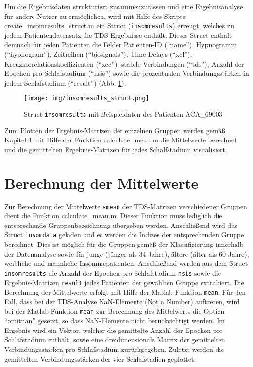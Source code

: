 Um die Ergebnisdaten strukturiert zusammenzufassen und eine Ergebnisanalyse für andere Nutzer zu ermöglichen, wird mit Hilfe des Skripts create\_insomresults\_struct.m ein Struct (\texttt{insomresults}) erzeugt, welches zu jedem Patientendatensatz die \acs{TDS}-Ergebnisse enthält. Dieses Struct enthält demnach für jeden Patienten die Felder Patienten-ID ("`name"'), Hypnogramm ("`hypnogram"'), Zeitreihen ("`biosignals"'), Time Delays ("`xcl"'), Kreuzkorrelationskoeffizienten ("`xcc"'), stabile Verbindungen ("`tds"'), Anzahl der Epochen pro Schlafstadium ("`nsis"') sowie die prozentualen Verbindungsstärken in jedem Schlafstadium ("`result"') (Abb. \ref{fig:resultstruct}).

\begin{figure}[H]
	\centering
	\texttt{[image: img/insomresults\_struct.png]}
	\caption[Struct \texttt{insomresults} mit Beispieldaten]{Struct \texttt{insomresults} mit Beispieldaten des Patienten ACA\_69003}
	\label{fig:resultstruct}
\end{figure}

Zum Plotten der Ergebnis-Matrizen der einzelnen Gruppen werden gemäß Kapitel \ref{mean} mit Hilfe der Funktion calculate\_mean.m die Mittelwerte berechnet und die gemittelten Ergebnis-Matrizen für jedes Schalfstadium visualisiert.

\section{Berechnung der Mittelwerte}\label{mean}

Zur Berechnung der Mittelwerte \texttt{smean} der \acs{TDS}-Matrizen verschiedener Gruppen dient die Funktion calculate\_mean.m. Dieser Funktion muss lediglich die entsprechende Gruppenbezeichnung übergeben werden. Anschließend wird das Struct \texttt{insomdata} geladen und es werden die Indizes der entsprechenden Gruppe berechnet. Dies ist möglich für die Gruppen gemäß der Klassifizierung innerhalb der Datenanalyse sowie für junge (jünger als 34 Jahre), ältere (älter als 60 Jahre), weibliche und männliche Insomniepatienten. Anschließend werden aus dem Struct \texttt{insomresults} die Anzahl der Epochen pro Schlafstadium \texttt{nsis} sowie die Ergebnis-Matrizen \texttt{result} jedes Patienten der gewählten Gruppe extrahiert. Die Berechnung der Mittelwerte erfolgt mit Hilfe der Matlab-Funktion \texttt{mean}. Für den Fall, dass bei der \acs{TDS}-Analyse NaN-Elemente (Not a Number) auftreten, wird bei der Matlab-Funktion \texttt{mean} zur Berechnung des Mittelwerts die Option "`omitnan"' gesetzt, so dass NaN-Elemente nicht berücksichtigt werden. Im Ergebnis wird ein Vektor, welcher die gemittelte Anzahl der Epochen pro Schlafstadium enthält, sowie eine dreidimensionale Matrix der gemittelten Verbindungsstärken pro Schlafstadium zurückgegeben. Zuletzt werden die gemittelten Verbindungsstärken der vier Schlafstadien geplottet.\\

